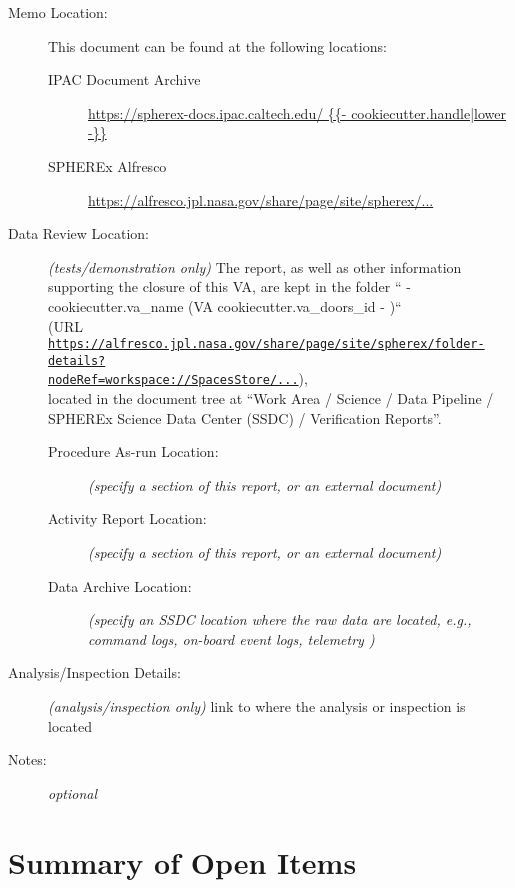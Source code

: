 \documentclass[TR]{spherex}
\begin{document}
\begin{description}
  \item[Memo Location:] This document can be found at the following locations:
    \begin{description}
      \item[IPAC Document Archive] \url{https://spherex-docs.ipac.caltech.edu/ {{- cookiecutter.handle|lower -}} }
      \item[SPHEREx Alfresco] \url{https://alfresco.jpl.nasa.gov/share/page/site/spherex/...}
    \end{description}
  \item[Data Review Location:] \textit{(tests/demonstration only)} The report, as well as other information supporting the closure of this VA, are kept in the folder
    `` {{- cookiecutter.va_name }} (VA {{ cookiecutter.va_doors_id -}} )`` \\
    (URL \href{https://alfresco.jpl.nasa.gov/share/page/site/spherex/folder-details?nodeRef=workspace://SpacesStore/...}{\texttt{https://alfresco.jpl.nasa.gov/share/page/site/spherex/folder-details?} \\
    \texttt{nodeRef=workspace://SpacesStore/...}}), \\
    located in the document tree at
    ``Work Area / Science / Data Pipeline / SPHEREx Science Data Center (SSDC) / Verification Reports''.
    \begin{description}
      \item[Procedure As-run Location:] \textit{(specify a section of this report, or an external document)}
      \item[Activity Report Location:] \textit{(specify a section of this report, or an external document)}
      \item[Data Archive Location:] \textit{(specify an SSDC location where the raw data are located, e.g., command logs, on-board event logs, telemetry )} \\
    \end{description}
  \item[Analysis/Inspection Details:] \textit{(analysis/inspection only)} link to where the analysis or inspection is located
  \item[Notes:] \textit{optional}
\end{description}


\section{Summary of Open Items}
\end{document}
